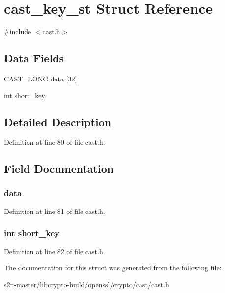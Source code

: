 \hypertarget{structcast__key__st}{}\section{cast\+\_\+key\+\_\+st Struct Reference}
\label{structcast__key__st}


{\ttfamily \#include $<$cast.\+h$>$}

\subsection*{Data Fields}
\begin{DoxyCompactItemize}
\item 
\hyperlink{include_2openssl_2cast_8h_a5f536ad3c10c7a7a51cdb6c75e8ae165}{C\+A\+S\+T\+\_\+\+L\+O\+NG} \hyperlink{structcast__key__st_aed9ab2945f6a5c93fd0da2d20cb5a43b}{data} \mbox{[}32\mbox{]}
\item 
int \hyperlink{structcast__key__st_ad723641d5bec1e72ed14a77d178fe1c3}{short\+\_\+key}
\end{DoxyCompactItemize}


\subsection{Detailed Description}


Definition at line 80 of file cast.\+h.



\subsection{Field Documentation}
\subsubsection[{\texorpdfstring{data}{data}}]{ data}\hypertarget{structcast__key__st_aed9ab2945f6a5c93fd0da2d20cb5a43b}{}\label{structcast__key__st_aed9ab2945f6a5c93fd0da2d20cb5a43b}


Definition at line 81 of file cast.\+h.

\subsubsection[{\texorpdfstring{short\+\_\+key}{short_key}}]{\setlength{\rightskip}{0pt plus 5cm}int short\+\_\+key}\hypertarget{structcast__key__st_ad723641d5bec1e72ed14a77d178fe1c3}{}\label{structcast__key__st_ad723641d5bec1e72ed14a77d178fe1c3}


Definition at line 82 of file cast.\+h.



The documentation for this struct was generated from the following file\+:\begin{DoxyCompactItemize}
\item 
s2n-\/master/libcrypto-\/build/openssl/crypto/cast/\hyperlink{crypto_2cast_2cast_8h}{cast.\+h}\end{DoxyCompactItemize}
